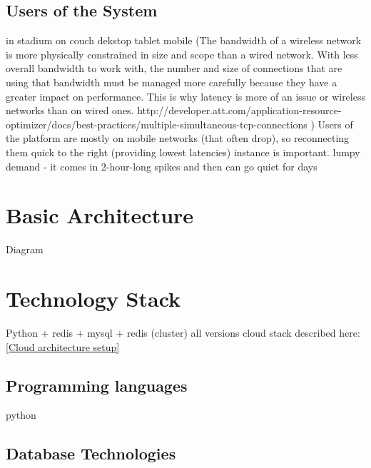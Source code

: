 \documentclass{uvamscse}
\begin{document}
\subsection{Users of the System}
in stadium
on couch
dekstop
tablet
mobile (The bandwidth of a wireless network is more physically constrained in size and scope than a wired network. With less overall bandwidth to work with, the number and size of connections that are using that bandwidth must be managed more carefully because they have a greater impact on performance. This is why latency is more of an issue or wireless networks than on wired ones.
http://developer.att.com/application-resource-optimizer/docs/best-practices/multiple-simultaneous-tcp-connections
)
Users of the platform are mostly on mobile networks (that often drop), so reconnecting them quick to the right (providing lowest latencies) instance is important.
lumpy demand - it comes in 2-hour-long spikes and then can go quiet for days

\section{Basic Architecture}

Diagram

\section{Technology Stack} \label{Technology Stack}
Python + redis + mysql + redis (cluster) all versions
cloud stack described here: \ref{Cloud architecture setup}

\subsection{Programming languages}

python

\subsection{Database Technologies}
\end{document}
